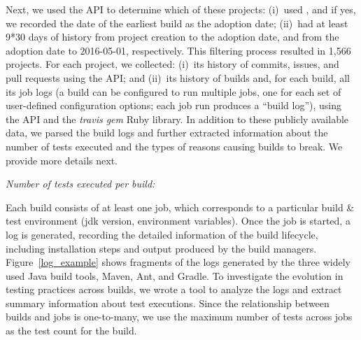 
Next, we used the \Tvis API to determine which of these projects:
(i)~used \Tvis, and if yes, we recorded the date of the earliest build as the 
adoption date; (ii)~had at least 9*30 days of history from project creation to 
the adoption date, and from the adoption date to 2016-05-01, respectively. 
This filtering process resulted in 1,566 projects.
For each project, we collected: (i)~its history of commits, issues, and pull 
requests using the \GH API; and (ii)~its history of \Tvis builds and, for each
build, all its job logs (a \Tvis build can be configured to run multiple jobs,
one for each set of user-defined configuration options; each job run produces 
a ``build log''), using the \Tvis API and the \textit{travis gem} Ruby library.  
In addition to these publicly available data, we parsed the build logs and 
further extracted information about the number of tests executed and the 
types of reasons causing builds to break.
We provide more details next.



\smallskip\noindent\emph{Number of tests executed per build:} 

Each \Tvis build consists of at least one job, which corresponds to a particular
build \& test environment (\eg jdk version, environment variables). 
Once the job is started, a log is generated, recording the detailed information
of the build lifecycle, including installation steps and output produced by the 
build managers. %
Figure~\ref{log_example} shows fragments of the logs generated by the 
three widely used Java build tools, Maven, Ant, and Gradle. 
To investigate the evolution in testing practices across builds, we wrote a tool 
to analyze the logs and extract summary information about test executions.  
Since the relationship between builds and jobs is one-to-many, we use the 
maximum number of tests across jobs as the test count for the build. 

